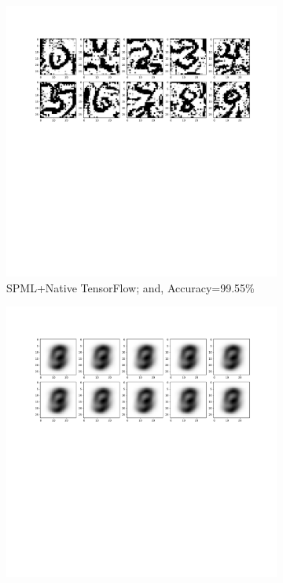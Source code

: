 \begin{figure}
     \begin{subfigure}{.325\textwidth}
         \includegraphics[width=\textwidth]{images/Native_attack/Mnistattack_native.pdf}
         \vspace{-8em}
         \caption{SPML+Native TensorFlow; and, Accuracy=99.55\%}
         \label{fig:nativeEps0}
     \end{subfigure}
     \begin{subfigure}{.325\textwidth}
         \includegraphics[width=\textwidth]{images/Native_attack/Mnistattack.2.pdf}

\end{subfigure}
\end{figure}

